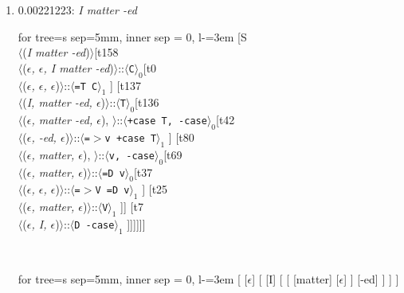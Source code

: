 \documentclass[11pt]{article}
\begin{document}
\begin{enumerate}
	\item  0.00221223: \textit{I matter -ed} \\[0.5em]
	\begin{adjustbox}{max width = \textwidth}
	\begin{forest}
	for tree={s sep=5mm, inner sep = 0, l-=3em}
	[S\\$\langle$(\textit{I matter -ed})$\rangle$[t158\\$\langle$(\textit{$\epsilon${,} $\epsilon${,} I matter -ed})$\rangle$::$\langle$\texttt{C}$\rangle_0$[t0\\$\langle$(\textit{$\epsilon${,} $\epsilon${,} $\epsilon$})$\rangle$::$\langle$\texttt{{=}T C}$\rangle_1$ ] [t137\\$\langle$(\textit{I{,} matter -ed{,} $\epsilon$})$\rangle$::$\langle$\texttt{T}$\rangle_0$[t136\\$\langle$(\textit{$\epsilon${,} matter -ed{,} $\epsilon$}){,} $\rangle$::$\langle$\texttt{+case T{,} -case}$\rangle_0$[t42\\$\langle$(\textit{$\epsilon${,} -ed{,} $\epsilon$})$\rangle$::$\langle$\texttt{{=}$>$v +case T}$\rangle_1$ ] [t80\\$\langle$(\textit{$\epsilon${,} matter{,} $\epsilon$}){,} $\rangle$::$\langle$\texttt{v{,} -case}$\rangle_0$[t69\\$\langle$(\textit{$\epsilon${,} matter{,} $\epsilon$})$\rangle$::$\langle$\texttt{{=}D v}$\rangle_0$[t37\\$\langle$(\textit{$\epsilon${,} $\epsilon${,} $\epsilon$})$\rangle$::$\langle$\texttt{{=}$>$V {=}D v}$\rangle_1$ ] [t25\\$\langle$(\textit{$\epsilon${,} matter{,} $\epsilon$})$\rangle$::$\langle$\texttt{V}$\rangle_1$ ]] [t7\\$\langle$(\textit{$\epsilon${,} I{,} $\epsilon$})$\rangle$::$\langle$\texttt{D -case}$\rangle_1$ ]]]]]]
	\end{forest}
	\end{adjustbox}
	\\
	\begin{adjustbox}{max width = \textwidth}
	\begin{forest}
	for tree={s sep=5mm, inner sep = 0, l-=3em}
	[ [$\epsilon$] [ [I] [ [ [matter] [$\epsilon$] ] [-ed] ] ] ]
	\end{forest}
	\end{adjustbox}
	\newpage


\end{enumerate}
\end{document}

